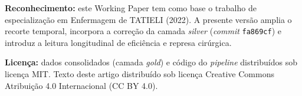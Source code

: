 \documentclass[12pt,a4paper,oneside]{article}
\begin{document}
\vspace{0.5cm}

\noindent\textbf{Reconhecimento:} este Working Paper tem como
base o trabalho de especialização em Enfermagem de TATIELI
(2022). A presente versão amplia o recorte temporal, incorpora
a correção da camada \textit{silver} (\textit{commit}
\texttt{fa869cf}) e introduz a leitura longitudinal de eficiência
e represa cirúrgica.

\vspace{0.5cm}

\noindent\textbf{Licença:} dados consolidados (camada \textit{gold})
e código do \textit{pipeline} distribuídos sob licença MIT.
Texto deste artigo distribuído sob licença Creative Commons
Atribuição 4.0 Internacional (CC BY 4.0).
\end{document}
